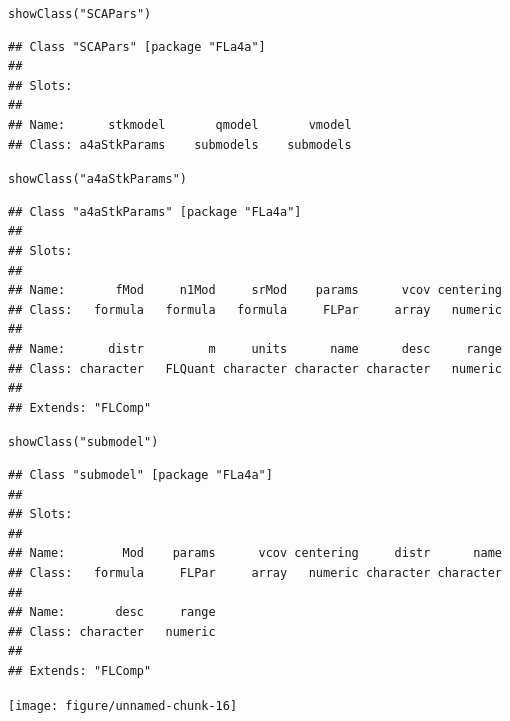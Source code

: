 \documentclass[a4paper,english,10pt]{article}\usepackage[]{graphicx}\usepackage[]{color}
\makeatletter
\newcommand{\hlstr}[1]{\textcolor[rgb]{0.2,0.2,0.2}{#1}}%
\newcommand{\hlstd}[1]{\textcolor[rgb]{0,0,0}{#1}}%
\newcommand{\hlkwd}[1]{\textcolor[rgb]{0.361,0.506,0.596}{#1}}%
\newenvironment{kframe}{%
 \def\at@end@of@kframe{}%
 \ifinner\ifhmode%
  \def\at@end@of@kframe{\end{minipage}}%
  \begin{minipage}{\columnwidth}%
 \fi\fi%
 \def\FrameCommand##1{\hskip\@totalleftmargin \hskip-\fboxsep
 \colorbox{shadecolor}{##1}\hskip-\fboxsep
     \hskip-\linewidth \hskip-\@totalleftmargin \hskip\columnwidth}%
 \MakeFramed {\advance\hsize-\width
   \@totalleftmargin\z@ \linewidth\hsize
   \@setminipage}}%
 {\par\unskip\endMakeFramed%
 \at@end@of@kframe}
\newenvironment{knitrout}{}{} %
\makeatother
\begin{document}
\begin{knitrout}
\color{fgcolor}\begin{kframe}
\begin{alltt}
\hlkwd{showClass}\hlstd{(}\hlstr{"SCAPars"}\hlstd{)}
\end{alltt}
\begin{verbatim}
## Class "SCAPars" [package "FLa4a"]
## 
## Slots:
##                                              
## Name:      stkmodel       qmodel       vmodel
## Class: a4aStkParams    submodels    submodels
\end{verbatim}
\begin{alltt}
\hlkwd{showClass}\hlstd{(}\hlstr{"a4aStkParams"}\hlstd{)}
\end{alltt}
\begin{verbatim}
## Class "a4aStkParams" [package "FLa4a"]
## 
## Slots:
##                                                                   
## Name:       fMod     n1Mod     srMod    params      vcov centering
## Class:   formula   formula   formula     FLPar     array   numeric
##                                                                   
## Name:      distr         m     units      name      desc     range
## Class: character   FLQuant character character character   numeric
## 
## Extends: "FLComp"
\end{verbatim}
\begin{alltt}
\hlkwd{showClass}\hlstd{(}\hlstr{"submodel"}\hlstd{)}
\end{alltt}
\begin{verbatim}
## Class "submodel" [package "FLa4a"]
## 
## Slots:
##                                                                   
## Name:        Mod    params      vcov centering     distr      name
## Class:   formula     FLPar     array   numeric character character
##                           
## Name:       desc     range
## Class: character   numeric
## 
## Extends: "FLComp"
\end{verbatim}
\end{kframe}
\end{knitrout}


\begin{knitrout}
\color{fgcolor}

{\centering \texttt{[image: figure/unnamed-chunk-16]} 

}



\end{knitrout}
\end{document}
